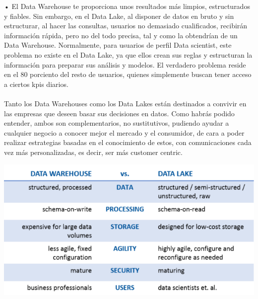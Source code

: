{•	El Data Warehouse te proporciona unos resultados más limpios, estructurados y fiables. Sin embargo, en el Data Lake, al disponer de datos en bruto y sin estructurar, al hacer las consultas, usuarios no demasiado cualificados, recibirán información rápida, pero no del todo precisa, tal y como la obtendrían de un Data Warehouse. Normalmente, para usuarios de perfil Data scientist, este problema no existe en el Data Lake, ya que ellos crean sus reglas y estructuran la información para preparar sus análisis y modelos. El verdadero problema reside en el 80 porciento del resto de usuarios, quienes simplemente buscan tener acceso a ciertos kpis diarios.\\\\
Tanto los Data Warehouses como los Data Lakes están destinados a convivir en las empresas que deseen basar sus decisiones en datos. Como habrás podido entender, ambos son complementarios, no sustitutivos, pudiendo ayudar a cualquier negocio a conocer mejor el mercado y el consumidor, de cara a poder realizar estrategias basadas en el conocimiento de estos, con comunicaciones cada vez más personalizadas, es decir, ser más customer centric.
}
\begin{center}
\includegraphics[width=14cm]{./Imagenes/imagen1}
\end{center}

